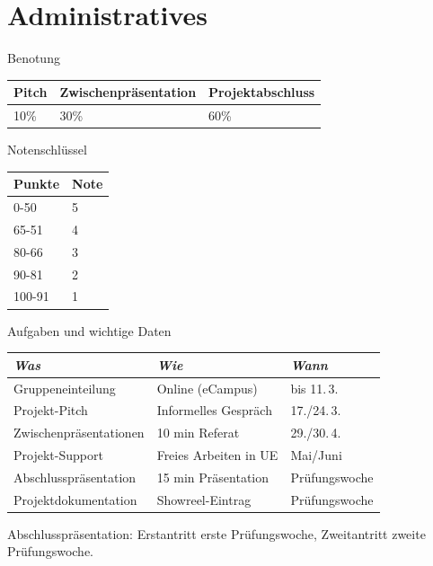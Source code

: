 
\section{Administratives}
 \frame{\sectionpage}

\begin{frame}{Benotung}

 
\begin{table}[]
\begin{tabular}{l|l|l}
Pitch & Zwischenpräsentation & Projektabschluss \\ \hline
10\%  & 30\%                & 60\%       
\end{tabular}
\end{table}



\end{frame}


\begin{frame}{Notenschlüssel}


 
\begin{table}[]
\begin{tabular}{l|l}
Punkte & Note \\ \hline
0-50   & 5    \\
65-51  & 4    \\
80-66  & 3    \\
90-81  & 2    \\
100-91 & 1   
\end{tabular}
\end{table}

\end{frame}


\begin{frame}{Aufgaben und wichtige Daten}
\begin{table}[]
\begin{tabular}{l|l|l}
\emph{Was}             &  \emph{Wie}           & \emph{Wann}	\\ \hline
Gruppeneinteilung      & Online (eCampus)      & bis 11.\,3.   \\
Projekt-Pitch          & Informelles Gespräch  & 17./24.\,3.	\\
Zwischenpräsentationen & 10 min Referat        & 29./30.\,4.	\\
Projekt-Support        & Freies Arbeiten in UE & Mai/Juni	\\
Abschlusspräsentation  & 15 min Präsentation   & Prüfungswoche \\
Projektdokumentation   & Showreel-Eintrag      & Prüfungswoche
\end{tabular}
\end{table}

Abschlusspräsentation: Erstantritt erste Prüfungswoche, Zweitantritt zweite Prüfungswoche.

\end{frame}



